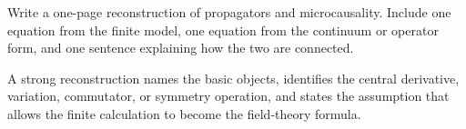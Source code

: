 \begin{exercise}
Write a one-page reconstruction of propagators and microcausality.  Include one equation from the finite model, one equation from the continuum or operator form, and one sentence explaining how the two are connected.
\begin{answer}
A strong reconstruction names the basic objects, identifies the central derivative, variation, commutator, or symmetry operation, and states the assumption that allows the finite calculation to become the field-theory formula.
\end{answer}
\end{exercise}
